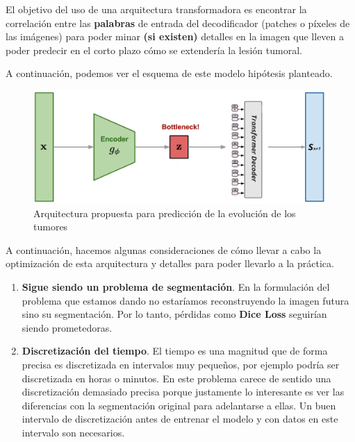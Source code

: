 El objetivo del uso de una arquitectura transformadora es encontrar la correlación entre las \textbf{palabras} de entrada del decodificador (patches o píxeles de las imágenes) para poder minar \textbf{(si existen)} detalles en la imagen que lleven a poder predecir en el corto plazo cómo se extendería la lesión tumoral.

A continuación, podemos ver el esquema de este modelo hipótesis planteado.

\begin{figure}[H]
	\centering
	\includegraphics[width=0.9\linewidth]{imagenes/esquema_evolucion.png}
	\caption{Arquitectura propuesta para predicción de la evolución de los tumores}
\end{figure}

A continuación, hacemos algunas consideraciones de cómo llevar a cabo la optimización de esta arquitectura y detalles para poder llevarlo a la práctica.

\begin{enumerate}
	\item \textbf{Sigue siendo un problema de segmentación}. En la formulación del problema que estamos dando no estaríamos reconstruyendo la imagen futura sino su segmentación. Por lo tanto, pérdidas como \textbf{Dice Loss} seguirían siendo prometedoras.
	\item \textbf{Discretización del tiempo}. El tiempo es una magnitud que de forma precisa es discretizada en intervalos muy pequeños, por ejemplo podría ser discretizada en horas o minutos. En este problema carece de sentido una discretización demasiado precisa porque justamente lo interesante es ver las diferencias con la segmentación original para adelantarse a ellas. Un buen intervalo de discretización antes de entrenar el modelo y con datos en este intervalo son necesarios.
\end{enumerate}
